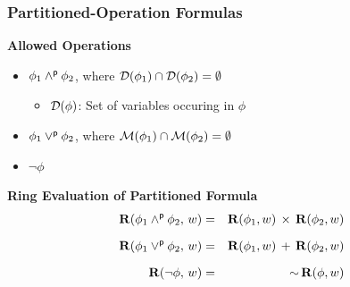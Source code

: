 \documentclass[t,pdf]{beamer}
\newcommand{\bitem}{\item[$\bullet$]}
\newcommand{\pand}{\mathbin{\land^{\sf p}}}
\newcommand{\por}{\mathbin{\lor^{\sf p}}}
\newcommand{\pneg}{{\sim}}
\begin{document}
\begin{frame}
  \frametitle{Partitioned-Operation Formulas}

\medskip

  {\bf Allowed Operations}
\smallskip
  \begin{itemize}
  \item {} $\phi_1 \pand \phi_2$, where ${\cal D}(\phi_1) \cap {\cal D}(\phi_2) = \emptyset$
\smallskip
    \begin{itemize}
      \bitem ${\cal D}(\phi)$: Set of variables occuring in $\phi$
    \end{itemize}
\smallskip
  \item {} $\phi_1 \por \phi_2$, where ${\cal M}(\phi_1) \cap {\cal M}(\phi_2) = \emptyset$
\smallskip
  \item {} $\neg \phi$
  \end{itemize}

  \bigskip
      {\bf Ring Evaluation of Partitioned Formula}
      \begin{eqnarray*}
        {\bf R}(\phi_1 \pand \phi_2,\, w) & = & {\bf R}(\phi_1, w) \,\times\, {\bf R}(\phi_2, w)\\[1.5ex]
        {\bf R}(\phi_1 \por \phi_2,\, w) & = & {\bf R}(\phi_1, w) \,+\, {\bf R}(\phi_2, w)\\[1.5ex]
        {\bf R}(\neg \phi,\, w) & = & \pneg \, {\bf R}(\phi, w)
      \end{eqnarray*}

\end{frame}
\end{document}
